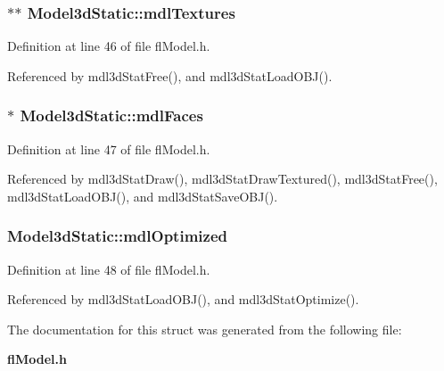\subsubsection{$\ast$$\ast$ {\bf Model3d\-Static::mdl\-Textures}}\label{structModel3dStatic_da364cceb75882dfd2fced93b60752c5}




Definition at line 46 of file fl\-Model.h.

Referenced by mdl3d\-Stat\-Free(), and mdl3d\-Stat\-Load\-OBJ().
\subsubsection{$\ast$ {\bf Model3d\-Static::mdl\-Faces}}\label{structModel3dStatic_d3f7bec7be2f393111234d72d23e2a80}




Definition at line 47 of file fl\-Model.h.

Referenced by mdl3d\-Stat\-Draw(), mdl3d\-Stat\-Draw\-Textured(), mdl3d\-Stat\-Free(), mdl3d\-Stat\-Load\-OBJ(), and mdl3d\-Stat\-Save\-OBJ().
\subsubsection{ {\bf Model3d\-Static::mdl\-Optimized}}\label{structModel3dStatic_ef784d36335fb5f1d5ea642ee7a1a74f}




Definition at line 48 of file fl\-Model.h.

Referenced by mdl3d\-Stat\-Load\-OBJ(), and mdl3d\-Stat\-Optimize().

The documentation for this struct was generated from the following file:\begin{CompactItemize}
\item 
{\bf fl\-Model.h}\end{CompactItemize}
